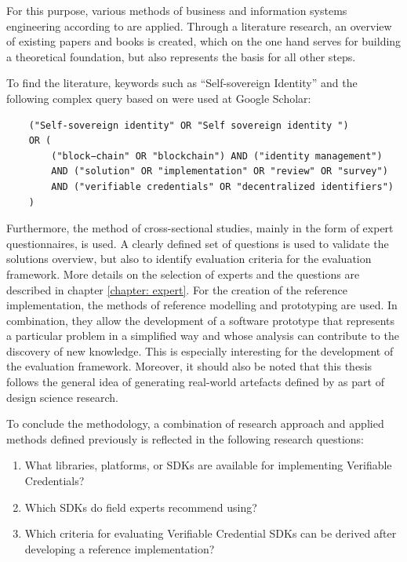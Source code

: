     For this purpose, various methods of business and information systems engineering according to \cite{wilde_forschungsmethoden_2007} are applied. Through a literature research, an overview of existing papers and books is created, which on the one hand serves for building a theoretical foundation, but also represents the basis for all other steps. 
    
    To find the literature, keywords such as “Self-sovereign Identity” and the following complex query based on \cite{van_bokkem_self-sovereign_2019} were used at Google Scholar:
    \begin{verbatim}
    ("Self-sovereign identity" OR "Self sovereign identity ") 
    OR ( 
        ("block−chain" OR "blockchain") AND ("identity management")
        AND ("solution" OR "implementation" OR "review" OR "survey")            
        AND ("verifiable credentials" OR "decentralized identifiers")
    )
    \end{verbatim}
    Furthermore, the method of cross-sectional studies, mainly in the form of expert questionnaires, is used. A clearly defined set of questions is used to validate the solutions overview, but also to identify evaluation criteria for the evaluation framework. More details on the selection of experts and the questions are described in chapter \ref{chapter: expert}. For the creation of the reference implementation, the methods of reference modelling and prototyping are used. In combination, they allow the development of a software prototype that represents a particular problem in a simplified way and whose analysis can contribute to the discovery of new knowledge. This is especially interesting for the development of the evaluation framework. Moreover, it should also be noted that this thesis follows the general idea of generating real-world artefacts defined by \cite{hevner_three_2007} as part of design science research.
    
    To conclude the methodology, a combination of research approach and applied methods defined previously is reflected in the following research questions: 
    
    \begin{enumerate}[label=RQ\arabic*:]
      \item What libraries, platforms, or SDKs are available for implementing Verifiable Credentials?
      \item Which SDKs do field experts recommend using?
      \item Which criteria for evaluating Verifiable Credential SDKs can be derived after developing a reference implementation?
    \end{enumerate}